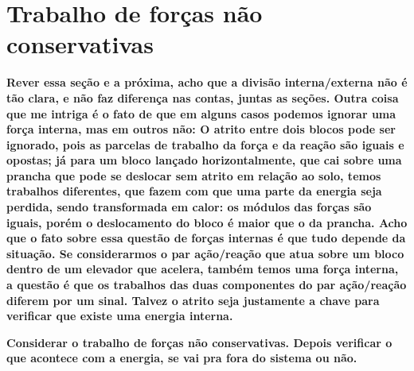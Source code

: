 
\section{Trabalho de forças não conservativas}
\label{Sec:TrabalhoForcasNaoConservativas}

\textbf{Rever essa seção e a próxima, acho que a divisão interna/externa não é tão clara, e não faz diferença nas contas, juntas as seções. Outra coisa que me intriga é o fato de que em alguns casos podemos ignorar uma força interna, mas em outros não: O atrito entre dois blocos pode ser ignorado, pois as parcelas de trabalho da força e da reação são iguais e opostas; já para um bloco lançado horizontalmente, que cai sobre uma prancha que pode se deslocar sem atrito em relação ao solo, temos trabalhos diferentes, que fazem com que uma parte da energia seja perdida, sendo transformada em calor: os módulos das forças são iguais, porém o deslocamento do bloco é maior que o da prancha. Acho que o fato sobre essa questão de forças internas é que tudo depende da situação. Se considerarmos o par ação/reação que atua sobre um bloco dentro de um elevador que acelera, também temos uma força interna, a questão é que os trabalhos das duas componentes do par ação/reação diferem por um sinal. Talvez o atrito seja justamente a chave para verificar que existe uma energia interna.}

\textbf{Considerar o trabalho de forças não conservativas. Depois verificar o que acontece com a energia, se vai pra fora do sistema ou não.}

